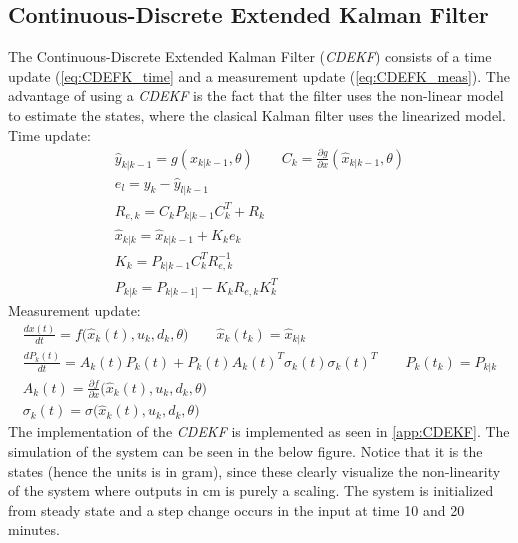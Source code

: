 \subsection{Continuous-Discrete Extended Kalman Filter}
The Continuous-Discrete Extended Kalman Filter (\textit{CDEKF}) consists of a time update (\cref{eq:CDEFK_time} and a measurement update (\cref{eq:CDEFK_meas}). The advantage of using a \textit{CDEKF} is the fact that the filter uses the non-linear model to estimate the states, where the clasical Kalman filter uses the linearized model.\\
Time update:
\begin{equation}
\label{eq:CDEFK_time}
    \begin{gathered}
        \hat{y}_{k|k-1}=g(\hat{x}_{k|k-1},\theta) \qquad C_k=\frac{\partial g}{\partial x}(\hat{x}_{k|k-1},\theta)\\
        e_l=y_k-\hat{y}_{l|k-1}\\
        R_{e,k}=C_kP_{k|k-1}C_k^T+R_k\\
        \hat{x}_{k|k}=\hat{x}_{k|k-1}+K_ke_k\\
        K_k=P_{k|k-1}C_k^TR_{e,k}^{-1}\\
        P_{k|k}=P_{k|k-1]}-K_kR_{e,k}K_k^T
    \end{gathered}
\end{equation}
Measurement update:
\begin{equation}
    \begin{gathered}
        \frac{dx(t)}{dt}=f\Big(\hat{x}_k(t),u_k,d_k,\theta\Big)\qquad\hat{x}_k(t_k)=\hat{x}_{k|k}\\
        \frac{dP_k(t)}{dt}=A_k(t)P_k(t)+P_k(t)A_k(t)^T\sigma_k(t)\sigma_k(t)^T\qquad P_k(t_k)=P_{k|k}\\
        A_k(t)=\frac{\partial f}{\partial x}\Big(\hat{x}_k(t),u_k,d_k,\theta\Big)\\
        \sigma_k(t)=\sigma\Big(\hat{x}_k(t),u_k,d_k,\theta\Big)
    \end{gathered}
\label{eq:CDEFK_meas}
\end{equation}
The implementation of the \textit{CDEKF} is implemented as seen in \cref{app:CDEKF}. The simulation of the system can be seen in the below figure. Notice that it is the states (hence the units is in gram), since these clearly visualize the non-linearity of the system where outputs in cm is purely a scaling. The system is initialized from steady state and a step change occurs in the input at time 10 and 20 minutes. 

